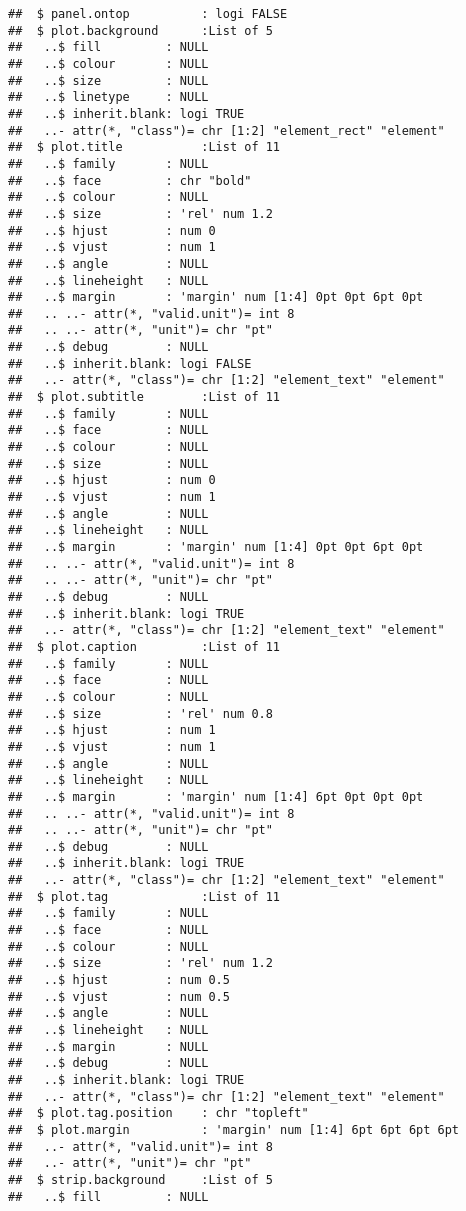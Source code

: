\documentclass[]{article}
\begin{document}
\begin{verbatim}
##  $ panel.ontop          : logi FALSE
##  $ plot.background      :List of 5
##   ..$ fill         : NULL
##   ..$ colour       : NULL
##   ..$ size         : NULL
##   ..$ linetype     : NULL
##   ..$ inherit.blank: logi TRUE
##   ..- attr(*, "class")= chr [1:2] "element_rect" "element"
##  $ plot.title           :List of 11
##   ..$ family       : NULL
##   ..$ face         : chr "bold"
##   ..$ colour       : NULL
##   ..$ size         : 'rel' num 1.2
##   ..$ hjust        : num 0
##   ..$ vjust        : num 1
##   ..$ angle        : NULL
##   ..$ lineheight   : NULL
##   ..$ margin       : 'margin' num [1:4] 0pt 0pt 6pt 0pt
##   .. ..- attr(*, "valid.unit")= int 8
##   .. ..- attr(*, "unit")= chr "pt"
##   ..$ debug        : NULL
##   ..$ inherit.blank: logi FALSE
##   ..- attr(*, "class")= chr [1:2] "element_text" "element"
##  $ plot.subtitle        :List of 11
##   ..$ family       : NULL
##   ..$ face         : NULL
##   ..$ colour       : NULL
##   ..$ size         : NULL
##   ..$ hjust        : num 0
##   ..$ vjust        : num 1
##   ..$ angle        : NULL
##   ..$ lineheight   : NULL
##   ..$ margin       : 'margin' num [1:4] 0pt 0pt 6pt 0pt
##   .. ..- attr(*, "valid.unit")= int 8
##   .. ..- attr(*, "unit")= chr "pt"
##   ..$ debug        : NULL
##   ..$ inherit.blank: logi TRUE
##   ..- attr(*, "class")= chr [1:2] "element_text" "element"
##  $ plot.caption         :List of 11
##   ..$ family       : NULL
##   ..$ face         : NULL
##   ..$ colour       : NULL
##   ..$ size         : 'rel' num 0.8
##   ..$ hjust        : num 1
##   ..$ vjust        : num 1
##   ..$ angle        : NULL
##   ..$ lineheight   : NULL
##   ..$ margin       : 'margin' num [1:4] 6pt 0pt 0pt 0pt
##   .. ..- attr(*, "valid.unit")= int 8
##   .. ..- attr(*, "unit")= chr "pt"
##   ..$ debug        : NULL
##   ..$ inherit.blank: logi TRUE
##   ..- attr(*, "class")= chr [1:2] "element_text" "element"
##  $ plot.tag             :List of 11
##   ..$ family       : NULL
##   ..$ face         : NULL
##   ..$ colour       : NULL
##   ..$ size         : 'rel' num 1.2
##   ..$ hjust        : num 0.5
##   ..$ vjust        : num 0.5
##   ..$ angle        : NULL
##   ..$ lineheight   : NULL
##   ..$ margin       : NULL
##   ..$ debug        : NULL
##   ..$ inherit.blank: logi TRUE
##   ..- attr(*, "class")= chr [1:2] "element_text" "element"
##  $ plot.tag.position    : chr "topleft"
##  $ plot.margin          : 'margin' num [1:4] 6pt 6pt 6pt 6pt
##   ..- attr(*, "valid.unit")= int 8
##   ..- attr(*, "unit")= chr "pt"
##  $ strip.background     :List of 5
##   ..$ fill         : NULL

\end{verbatim}
\end{document}
